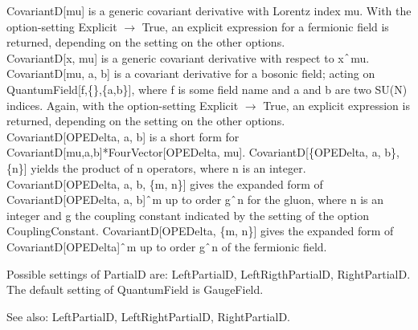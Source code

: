 CovariantD[mu] is a generic covariant derivative with Lorentz index mu. With the option-setting Explicit \(\rightarrow \) True, an
  explicit expression for a fermionic field is returned, depending on the setting on the other options.\\
CovariantD[x, mu] is a generic covariant derivative with respect to x\(\RawWedge\)mu.\\
CovariantD[mu, a, b] is a covariant derivative for a bosonic field; acting on QuantumField[f,\{\},\{a,b\}], where f is some field name
  and a and b are two SU(N) indices. Again, with the option-setting Explicit \(\rightarrow \) True, an explicit expression is returned,
  depending on the setting on the other options.\\
CovariantD[OPEDelta, a, b] is a short form for { }CovariantD[mu,a,b]*FourVector[OPEDelta, mu]. CovariantD[\{OPEDelta, a, b\}, \{n\}]
  yields the product of n operators, where n is an integer. { }CovariantD[OPEDelta, a, b, \{m, n\}] { }gives the expanded form of
  CovariantD[OPEDelta, a, b]\(\RawWedge\)m up to order g\(\RawWedge\)n for the gluon, where n is an integer and g the coupling constant {
  }indicated by the setting of the option CouplingConstant. CovariantD[OPEDelta, \{m, n\}] gives the expanded form of {
  }CovariantD[OPEDelta]\(\RawWedge\)m up to order g\(\RawWedge\)n of the fermionic field.



 Possible settings of PartialD are: LeftPartialD, LeftRigthPartialD, RightPartialD. The default setting of QuantumField is GaugeField.

See also:  LeftPartialD, LeftRightPartialD, RightPartialD.




